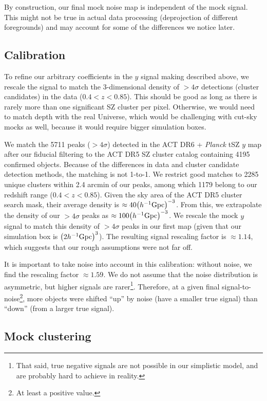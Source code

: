 By construction, our final mock noise map is independent of the mock signal.
This might not be true in actual data processing (deprojection of different foregrounds) and may account for some of the differences we notice later.

\subsection{Calibration}

To refine our arbitrary coefficients in the $y$ signal making described above, we rescale the signal to match the 3-dimensional density of $>4\sigma$ detections (cluster candidates) in the data ($0.4<z<0.85$).
This should be good as long as there is rarely more than one significant SZ cluster per pixel.
Otherwise, we would need to match depth with the real Universe, which would be challenging with cut-sky mocks as well, because it would require bigger simulation boxes.

We match the 5711 peaks ($>4\sigma$) detected in the ACT DR6 + {\it Planck} tSZ $y$ map after our fiducial filtering to the ACT DR5 SZ cluster catalog \citep{ACT-SZ-clusters-DR5} containing 4195 confirmed objects.
Because of the differences in data and cluster candidate detection methods, the matching is not 1-to-1.
We restrict good matches to 2285 unique clusters within 2.4 arcmin of our peaks, among which 1179 belong to our redshift range ($0.4<z<0.85$).
Given the sky area of the ACT DR5 cluster search mask, their average density is $\approx 40 \qty(h^{-1}{\rm Gpc})^{-3}$.
From this, we extrapolate the density of our $>4\sigma$ peaks as $\approx 100 \qty(h^{-1}{\rm Gpc})^{-3}$.
We rescale the mock $y$ signal to match this density of $>4\sigma$ peaks in our first map (given that our simulation box is $\qty(2h^{-1}{\rm Gpc})^3$).
The resulting signal rescaling factor is $\approx 1.14$, which suggests that our rough assumptions were not far off.

It is important to take noise into account in this calibration: without noise, we find the rescaling factor $\approx 1.59$.
We do not assume that the noise distribution is asymmetric, but higher signals are rarer\footnote{That said, true negative signals are not possible in our simplistic model, and are probably hard to achieve in reality.}.
Therefore, at a given final signal-to-noise\footnote{At least a positive value.}, more objects were shifted ``up'' by noise (have a smaller true signal) than ``down'' (from a larger true signal).

\subsection{Mock clustering}

